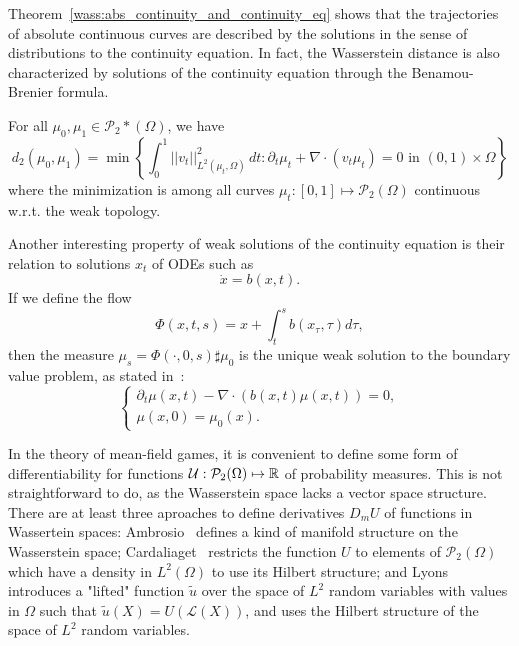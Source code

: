 Theorem~\eqref{wass:abs_continuity_and_continuity_eq} shows that the trajectories of absolute continuous curves are described
by the solutions in the sense of distributions to the continuity equation. In fact, the Wasserstein distance is also characterized
by solutions of the continuity equation through the Benamou-Brenier formula.

\begin{theorem}
    For all  $\mu_0, \mu_1 \in \mathcal{P}_2*(\Omega)$, we have
    \begin{equation}
        d_2(\mu_0, \mu_1) = \min \left\{ \int_0^1 ||v_t||^2_{L^2(\mu_t, \Omega)} \, dt : \partial_t \mu_t + \nabla \cdot (v_t \mu_t) = 0 \text{ in } (0,1) \times \Omega \right\}
    \end{equation} 
    where the minimization is among all curves $\mu_t : [0,1] \mapsto \mathcal{P}_2(\Omega)$
    continuous w.r.t. the weak topology.
\end{theorem}

Another interesting property of weak solutions of the continuity equation is their relation to solutions $x_t$ of ODEs such as
\begin{equation}
    \dot x = b(x,t).
\end{equation}
If we define the flow 
\begin{equation}
    \Phi(x,t,s) = x + \int_t^s b(x_\tau, \tau) d\tau, 
\end{equation}
then the measure $\mu_s = \Phi(\cdot, 0, s) \sharp \mu_0$ is the unique weak solution to the boundary value problem, as stated in~\cite{cardaliaguet2010notes}:
\begin{equation}
    \begin{cases}
        \partial_t \mu(x,t) - \nabla \cdot ( b(x,t) \mu(x,t) ) = 0,\\
        \mu(x,0) =  \mu_0(x). 
    \end{cases}
\end{equation}


In the theory of mean-field games, it is convenient to define some
form of differentiability for functions
 $\mathcal{U} : \mathcal{P}_2(\Omega) \mapsto \mathbb{R}$ of probability measures.
 This is not straightforward to do, as the Wasserstein space lacks a vector space
 structure.
There are at least three aproaches to define derivatives $D_m U$ of functions in
Wassertein spaces: 
Ambrosio~\cite{ambrosio2005gradient} defines a kind of manifold structure
on the Wasserstein space;
Cardaliaget~\cite{cardaliaguet2019master} restricts the 
function $U$ to elements of $\mathcal{P}_2(\Omega)$ which have a density in 
$L^2(\Omega)$ to use its Hilbert structure; and 
Lyons~\cite{cardaliaguet2010notes} introduces a "lifted" function $\tilde u$ over the space of $L^2$ random variables with values
in $\Omega$ such that $\tilde u(X) = U(\mathcal{L}(X))$, and uses the Hilbert structure
of the space of $L^2$ random variables.


